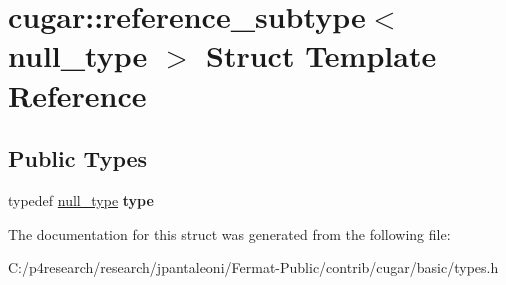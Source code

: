\hypertarget{structcugar_1_1reference__subtype_3_01null__type_01_4}{}\section{cugar\+:\+:reference\+\_\+subtype$<$ null\+\_\+type $>$ Struct Template Reference}
\label{structcugar_1_1reference__subtype_3_01null__type_01_4}
\subsection*{Public Types}
\begin{DoxyCompactItemize}
\item 
\mbox{\label{structcugar_1_1reference__subtype_3_01null__type_01_4_a32f723743eae425ff1b93bad606b7f46}} 
typedef \hyperlink{structcugar_1_1null__type}{null\+\_\+type} {\bfseries type}
\end{DoxyCompactItemize}


The documentation for this struct was generated from the following file\+:\begin{DoxyCompactItemize}
\item 
C\+:/p4research/research/jpantaleoni/\+Fermat-\/\+Public/contrib/cugar/basic/types.\+h\end{DoxyCompactItemize}
